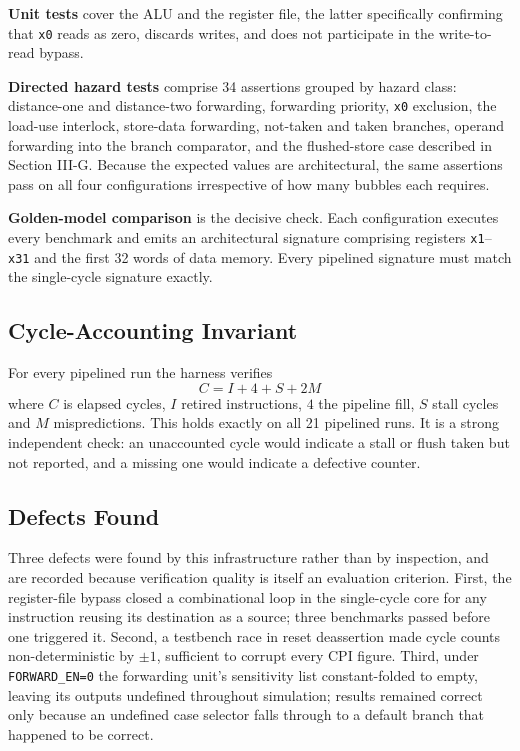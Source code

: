 \documentclass[conference]{IEEEtran}
\begin{document}
\textbf{Unit tests} cover the ALU and the register file, the latter
specifically confirming that \texttt{x0} reads as zero, discards writes,
and does not participate in the write-to-read bypass.

\textbf{Directed hazard tests} comprise 34 assertions grouped by hazard
class: distance-one and distance-two forwarding, forwarding priority,
\texttt{x0} exclusion, the load-use interlock, store-data forwarding,
not-taken and taken branches, operand forwarding into the branch
comparator, and the flushed-store case described in Section III-G. Because
the expected values are architectural, the same assertions pass on all four
configurations irrespective of how many bubbles each requires.

\textbf{Golden-model comparison} is the decisive check. Each configuration
executes every benchmark and emits an architectural signature comprising
registers \texttt{x1}--\texttt{x31} and the first 32 words of data memory.
Every pipelined signature must match the single-cycle signature exactly.

\subsection{Cycle-Accounting Invariant}

For every pipelined run the harness verifies
\begin{equation}
C = I + 4 + S + 2M
\label{eq:accounting}
\end{equation}
where $C$ is elapsed cycles, $I$ retired instructions, $4$ the pipeline
fill, $S$ stall cycles and $M$ mispredictions. This holds exactly on all 21
pipelined runs. It is a strong independent check: an unaccounted cycle
would indicate a stall or flush taken but not reported, and a missing one
would indicate a defective counter.

\subsection{Defects Found}

Three defects were found by this infrastructure rather than by inspection,
and are recorded because verification quality is itself an evaluation
criterion. First, the register-file bypass closed a combinational loop in
the single-cycle core for any instruction reusing its destination as a
source; three benchmarks passed before one triggered it. Second, a
testbench race in reset deassertion made cycle counts non-deterministic by
$\pm1$, sufficient to corrupt every CPI figure. Third, under
\texttt{FORWARD\_EN=0} the forwarding unit's sensitivity list constant-folded
to empty, leaving its outputs undefined throughout simulation; results
remained correct only because an undefined case selector falls through to a
default branch that happened to be correct.
\end{document}
